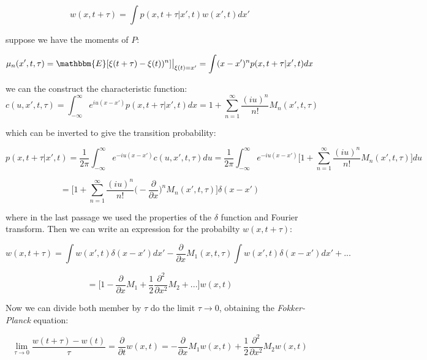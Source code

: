 \documentclass{article}
\begin{document}
\begin{equation}
w(x,t+\tau) = \int p(x,t+\tau | x',t) w(x',t) dx'
\end{equation}

suppose we have the moments of $P$:

\begin{equation}
\mu_n(x',t,\tau) = \mathbbm{E} [\xi(t+\tau)-\xi(t))^n ] \big |_{\xi(t)=x'} = \int (x-x')^n p(x,t+\tau|x',t) dx
\end{equation}

we can the construct the characteristic function:
\begin{equation}
c(u,x',t,\tau) = \int_{- \infty }^{ \infty } e^{iu(x-x')} p(x,t+\tau|x',t) dx = 1 + \sum_{n=1}^{\infty} \frac{(iu)^n}{n!}M_n(x',t,\tau)
\end{equation}

which can be inverted to give the transition probability:

$$ p(x,t+\tau|x',t) = \frac{1}{2\pi}  \int_{- \infty }^{ \infty } e^{-iu(x-x')} c(u,x',t,\tau) du = \frac{1}{2\pi}  \int_{- \infty }^{ \infty } e^{-iu(x-x')} \big [ 1 + \sum_{n=1}^{\infty} \frac{(iu)^n}{n!}M_n(x',t,\tau) \big ] du $$

\begin{equation}
=  [ 1 + \sum_{n=1}^{\infty} \frac{(iu)^n}{n!} \big ( - \frac{ \partial}{\partial x} \big )^n M_n(x',t,\tau) \big ] \delta(x-x')
\end{equation}

where in the last passage we used the properties of the $\delta$ function and Fourier transform. Then we can write an expression for the probabilty $w(x,t+\tau)$:

$$ w(x,t+\tau) = \int w(x',t) \delta(x-x')dx' - \frac{\partial}{\partial x} M_1(x,t,\tau) \int w(x',t) \delta(x-x') dx' + ... $$

\begin{equation}
= \big[ 1- \frac{\partial}{\partial x} M_1 + \frac{1}{2} \frac{\partial^2}{\partial x^2}M_2 +... \big]w(x,t) 
\end{equation}


Now we can divide both member by $\tau$ do the limit $\tau \to 0$, obtaining the \textit{Fokker-Planck} equation:

\begin{equation}
\lim\limits_{\tau \to 0} \frac{w(t+\tau)-w(t)}{\tau} = \frac{\partial}{\partial t} w(x,t)= - \frac{\partial}{\partial x} M_1 w(x,t) + \frac{1}{2} \frac{\partial^2}{\partial x^2}M_2 w(x,t)
\end{equation}
\end{document}
